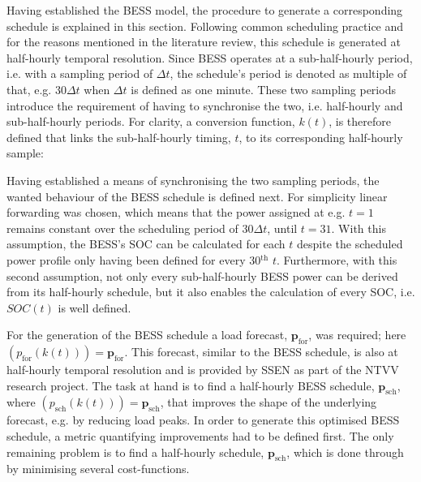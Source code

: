 Having established the BESS model, the procedure to generate a corresponding schedule is explained in this section.
Following common scheduling practice and for the reasons mentioned in the literature review, this schedule is generated at half-hourly temporal resolution.
Since BESS operates at a sub-half-hourly period, i.e. with a sampling period of $\Delta t$, the schedule's period is denoted as multiple of that, e.g. $30\Delta t$ when $\Delta t$ is defined as one minute.
These two sampling periods introduce the requirement of having to synchronise the two, i.e. half-hourly and sub-half-hourly periods.
For clarity, a conversion function, $k(t)$, is therefore defined that links the sub-half-hourly timing, $t$, to its corresponding half-hourly sample:



Having established a means of synchronising the two sampling periods, the wanted behaviour of the BESS schedule is defined next.
For simplicity linear forwarding was chosen, which means that the power assigned at e.g. $t=1$ remains constant over the scheduling period of $30\Delta t$, until $t=31$.
With this assumption, the BESS's SOC can be calculated for each $t$ despite the scheduled power profile only having been defined for every 30$^\text{th}$ $t$.
Furthermore, with this second assumption, not only every sub-half-hourly BESS power can be derived from its half-hourly schedule, but it also enables the calculation of every SOC, i.e. $SOC(t)$ is well defined.


For the generation of the BESS schedule a load forecast, $\textbf{p}_\text{for}$, was required; here $(p_\text{for}(k(t))) = \textbf{p}_\text{for}$.
This forecast, similar to the BESS schedule, is also at half-hourly temporal resolution and is provided by SSEN as part of the NTVV research project.
The task at hand is to find a half-hourly BESS schedule, $\textbf{p}_\text{sch}$, where $(p_\text{sch}(k(t))) = \textbf{p}_\text{sch}$, that improves the shape of the underlying forecast, e.g. by reducing load peaks.
In order to generate this optimised BESS schedule, a metric quantifying improvements had to be defined first.
The only remaining problem is to find a half-hourly schedule, $\textbf{p}_\text{sch}$, which is done through by minimising several cost-functions.

